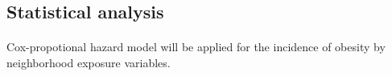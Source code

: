 \documentclass[12]{article}
\begin{document}
\subsection{Statistical analysis}
\paragraph{}
Cox-propotional hazard model will be applied for the incidence of obesity by neighborhood exposure variables. 
	    
\end{document}
